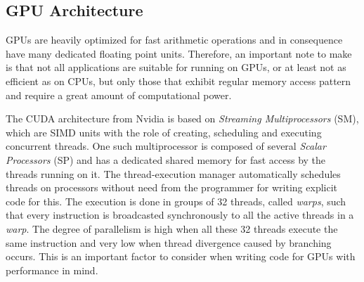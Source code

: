


\subsection{GPU Architecture}

GPUs are heavily optimized for fast arithmetic operations and in consequence
have many dedicated floating point units. Therefore, an important note to make
is that not all applications are suitable for running on GPUs, or at least not
as efficient as on CPUs, but only those that exhibit regular memory access
pattern and require a great amount of computational power.


The CUDA architecture from Nvidia is based on \textit{Streaming Multiprocessors}
(SM), which are SIMD units with the role of creating, scheduling and executing
concurrent threads. One such multiprocessor is composed of several
\textit{Scalar Processors} (SP) and has a dedicated shared memory for fast
access by the threads running on it. The thread-execution manager automatically
schedules threads on processors without need from the programmer for writing
explicit code for this. The execution is done in groups of 32 threads, called
\textit{warps}, such that every instruction is broadcasted synchronously to all
the active threads in a \textit{warp}. The degree of parallelism is high when
all these 32 threads execute the same instruction and very low when thread
divergence caused by branching occurs. This is an important factor to consider
when writing code for GPUs with performance in mind.

